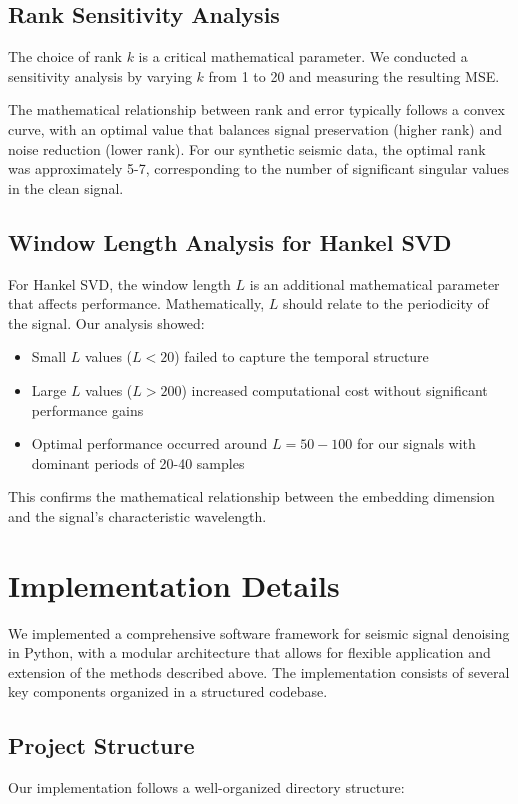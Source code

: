 \documentclass[11pt]{article}
\begin{document}
\subsection{Rank Sensitivity Analysis}
The choice of rank $k$ is a critical mathematical parameter. We conducted a sensitivity analysis by varying $k$ from 1 to 20 and measuring the resulting MSE.

The mathematical relationship between rank and error typically follows a convex curve, with an optimal value that balances signal preservation (higher rank) and noise reduction (lower rank). For our synthetic seismic data, the optimal rank was approximately 5-7, corresponding to the number of significant singular values in the clean signal.

\subsection{Window Length Analysis for Hankel SVD}
For Hankel SVD, the window length $L$ is an additional mathematical parameter that affects performance. Mathematically, $L$ should relate to the periodicity of the signal. Our analysis showed:

\begin{itemize}
\item Small $L$ values ($L < 20$) failed to capture the temporal structure
\item Large $L$ values ($L > 200$) increased computational cost without significant performance gains
\item Optimal performance occurred around $L = 50-100$ for our signals with dominant periods of 20-40 samples
\end{itemize}

This confirms the mathematical relationship between the embedding dimension and the signal's characteristic wavelength.

\section{Implementation Details}
We implemented a comprehensive software framework for seismic signal denoising in Python, with a modular architecture that allows for flexible application and extension of the methods described above. The implementation consists of several key components organized in a structured codebase.

\subsection{Project Structure}
Our implementation follows a well-organized directory structure:
\end{document}
